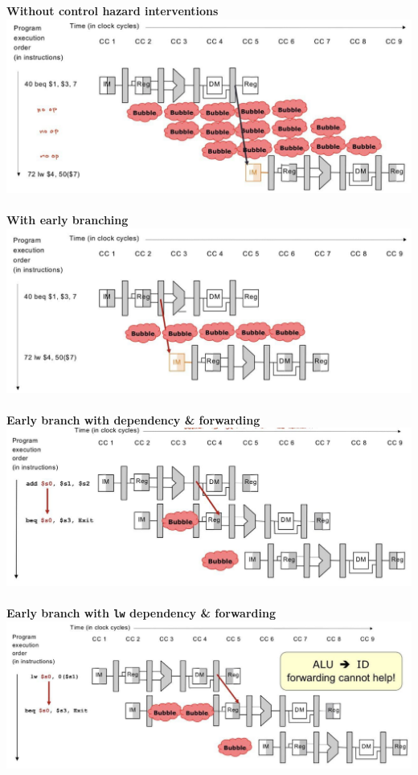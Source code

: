 \documentclass[a4paper]{article} \usepackage[backend=biber, style=numeric, sorting=none]{biblatex}
\begin{document}
\begin{multicols*}{4}
\columnbreak
\textbf{Without control hazard interventions\\}
\includegraphics[width=0.95\columnwidth]{no_control.jpg}
\textbf{\\\\With early branching\\}
\includegraphics[width=0.90\columnwidth]{early_branch.jpg}
\textbf{\\\\Early branch with dependency \& forwarding\\}
\includegraphics[width=0.90\columnwidth]{early_branch_with_dependency.jpg}
\textbf{\\\\Early branch with \texttt{lw} dependency \& forwarding\\}
\includegraphics[width=0.90\columnwidth]{early_branch_with_lw_dependency.jpg}

\end{multicols*}
\end{document}
